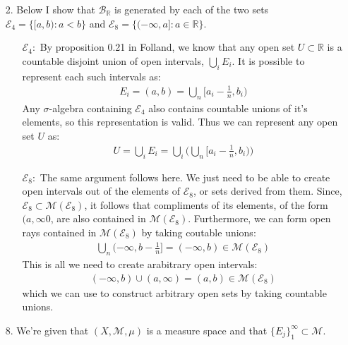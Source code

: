 \documentclass[11pt,letter]{article}
\begin{document}
\begin{enumerate}
    \item[2.] Below I show that $\mathcal{B}_\mathbb{R}$ is generated by each of the two sets $\mathcal{E}_4 = \{[a,b):a<b\}$ and $\mathcal{E}_8 = \{(-\infty,a]:a \in \mathbb{R}\}$.
    \begin{enumerate}
        \item [$\mathcal{E}_4:$] By proposition 0.21 in Folland, we know that any open set $U \subset \mathbb{R}$ is a countable disjoint union of open intervals, $\bigcup\limits_i E_i$. It is possible to represent each such intervals as:
        \begin{align*}
            E_i = (a,b) = \bigcup\limits_n [a_i - \frac{1}{n}, b_i)
        \end{align*}
        Any $\sigma$-algebra containing $\mathcal{E}_4$ also contains countable unions of it's elements, so this representation is valid. Thus we can represent any open set $U$ as:
        \begin{align*}
            U = \bigcup\limits_i E_i  = \bigcup\limits_i \Big (\bigcup\limits_n [a_i - \frac{1}{n}, b_i) \Big )
        \end{align*}

        \item [$\mathcal{E}_8:$] The same argument follows here. We just need to be able to create open intervals out of the elements of $\mathcal{E}_8$, or sets derived from them. Since, $\mathcal{E}_8 \subset \mathcal{M}(\mathcal{E}_8)$, it follows that compliments of its elements, of the form $(a,\infty0$, are also contained in $\mathcal{M}(\mathcal{E}_8)$. Furthermore, we can form open rays contained in $\mathcal{M}(\mathcal{E}_8)$ by taking coutable unions:
        \begin{align*}
            \bigcup\limits_n (-\infty, b - \frac{1}{n}] = (-\infty,b) \in \mathcal{M}(\mathcal{E}_8)
        \end{align*}
        This is all we need to create arabitrary open intervals:
        \begin{align*}
            (-\infty, b) \cup (a, \infty) = (a,b) \in \mathcal{M}(\mathcal{E}_8)
        \end{align*}
        which we can use to construct arbitrary open sets by taking countable unions.
    \end{enumerate}

    \item[8.] We're given that $(X,\mathcal{M},\mu)$ is a measure space and that $\{E_j\}_1^\infty \subset \mathcal{M}$.
    

\end{enumerate}
\end{document}
